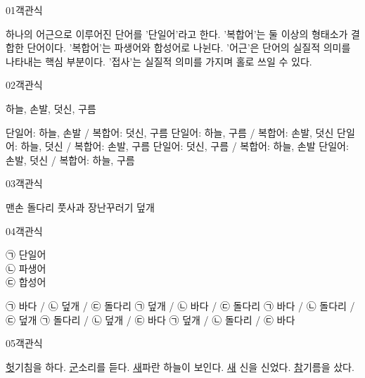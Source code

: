 \documentclass[fs9,seriesRus]{korfarm-base}
\begin{document}

\par\medskip
\kfBeginMC
\begin{kfQBlock}{01}{객관식}
\begin{kfChoices}
\kfChoice 하나의 어근으로 이루어진 단어를 '단일어'라고 한다.
\kfChoice '복합어'는 둘 이상의 형태소가 결합한 단어이다.
\kfChoice '복합어'는 파생어와 합성어로 나뉜다.
\kfChoice '어근'은 단어의 실질적 의미를 나타내는 핵심 부분이다.
\kfChoice '접사'는 실질적 의미를 가지며 홀로 쓰일 수 있다.
\end{kfChoices}
\end{kfQBlock}
\begin{kfQBlock}{02}{객관식}
\begin{kfEvidence}하늘, 손발, 덧신, 구름\end{kfEvidence}
\begin{kfChoices}
\kfChoice 단일어: 하늘, 손발 / 복합어: 덧신, 구름
\kfChoice 단일어: 하늘, 구름 / 복합어: 손발, 덧신
\kfChoice 단일어: 하늘, 덧신 / 복합어: 손발, 구름
\kfChoice 단일어: 덧신, 구름 / 복합어: 하늘, 손발
\kfChoice 단일어: 손발, 덧신 / 복합어: 하늘, 구름
\end{kfChoices}
\end{kfQBlock}
\begin{kfQBlock}{03}{객관식}
\begin{kfChoices}
\kfChoice 맨손
\kfChoice 돌다리
\kfChoice 풋사과
\kfChoice 장난꾸러기
\kfChoice 덮개
\end{kfChoices}
\end{kfQBlock}
\begin{kfQBlock}{04}{객관식}
\begin{kfEvidence}㉠ 단일어 \\\relax
㉡ 파생어 \\\relax
㉢ 합성어\end{kfEvidence}
\begin{kfChoices}
\kfChoice ㉠ 바다 / ㉡ 덮개 / ㉢ 돌다리
\kfChoice ㉠ 덮개 / ㉡ 바다 / ㉢ 돌다리
\kfChoice ㉠ 바다 / ㉡ 돌다리 / ㉢ 덮개
\kfChoice ㉠ 돌다리 / ㉡ 덮개 / ㉢ 바다
\kfChoice ㉠ 덮개 / ㉡ 돌다리 / ㉢ 바다
\end{kfChoices}
\end{kfQBlock}
\begin{kfQBlock}{05}{객관식}
\begin{kfChoices}
\kfChoice \uline{헛}기침을 하다.
\kfChoice \uline{군}소리를 듣다.
\kfChoice \uline{새}파란 하늘이 보인다.
\kfChoice \uline{새} 신을 신었다.
\kfChoice \uline{참}기름을 샀다.
\end{kfChoices}
\end{kfQBlock}
\end{document}
